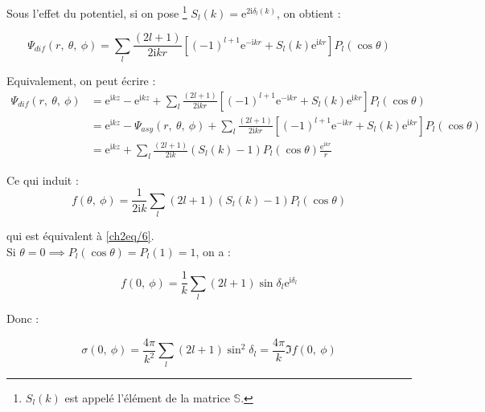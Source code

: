 \documentclass[12pt,a4paper,oneside,french]{book}
\renewcommand{\i}{\mathrm{i}}
\newcommand{\e}{\mathrm{e}}
\theoremstyle{definition}
\theoremstyle{definition}
\theoremstyle{definition}
\theoremstyle{remark}
\theoremstyle{definition}
\begin{document}
    Sous l'effet du potentiel, si on pose \footnote{${S}_{l}(k)$ est appelé l'élément de la matrice $\mathbb{S}$.} ${S}_{l}(k) = {\e}^{2\i {\delta}_{l}(k)}$, on obtient :
    
    \begin{equation*}
        {\Psi}_{dif}(r, \ \theta, \ \phi) = \sum_{l} \frac{(2l + 1)}{2 \i k r} \left[{(-1)}^{l + 1} {\e}^{-\i k r} + {S}_{l}(k) {\e}^{\i k r}\right] {P}_{l}(\cos{\theta})
    \end{equation*}
    
    \bigskip
    
    Equivalement, on peut écrire :
    \begin{equation*}
    \begin{split}
        {\Psi}_{dif}(r, \ \theta, \ \phi) 
            &= {\e}^{\i k z} - {\e}^{\i k z} + \sum_{l} \frac{(2l + 1)}{2 \i k r} \left[{(-1)}^{l + 1} {\e}^{-\i k r} + {S}_{l}(k) {\e}^{\i k r}\right] {P}_{l}(\cos{\theta}) \\
            &= {\e}^{\i k z} - {\Psi}_{asy}(r, \ \theta, \ \phi) + \sum_{l} \frac{(2l + 1)}{2 \i k r} \left[{(-1)}^{l + 1} {\e}^{-\i k r} + {S}_{l}(k) {\e}^{\i k r}\right] {P}_{l}(\cos{\theta}) \\
            &= {\e}^{\i k z} + \sum_{l} \frac{(2l + 1)}{2 \i k} \left({S}_{l}(k) - 1\right) {P}_{l}(\cos{\theta}) \frac{{\e}^{\i k r}}{r}
    \end{split}
    \end{equation*}
    
    Ce qui induit :
    \begin{equation*}
        f(\theta, \ \phi) = \frac{1}{2 \i k} \sum_{l} (2l + 1) \left({S}_{l}(k) - 1\right) {P}_{l}(\cos{\theta})
    \end{equation*}
    
    qui est équivalent à \eqref{ch2eq/6}. \\
    
    Si $\theta = 0 \implies {P}_{l}(\cos{\theta}) = {P}_{l}(1) = 1$, on a :
    
    \begin{equation*}
        f(0, \ \phi) = \frac{1}{k} \sum_{l} (2l + 1) \sin{{\delta}_{l}} {\e}^{\i {\delta}_{l}}
    \end{equation*}
    
    Donc : 
    
    \begin{equation*}
        \sigma(0, \ \phi) = \frac{4\pi}{{k}^{2}} \sum_{l} (2l + 1) \sin^2 {{\delta}_{l}} = \frac{4\pi}{k} \Im f(0, \ \phi)
    \end{equation*}
    
\end{document}
